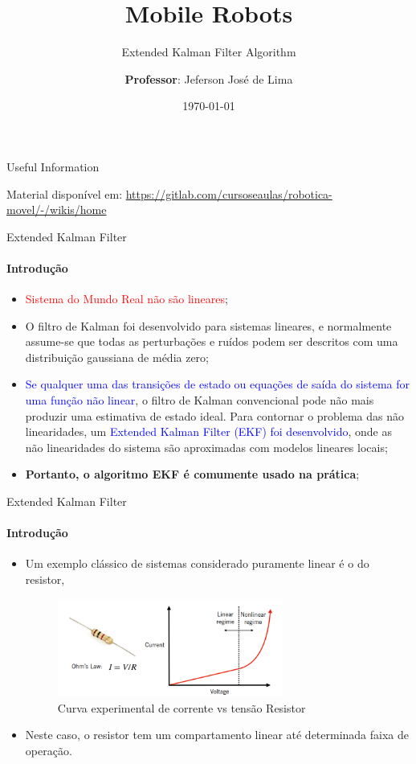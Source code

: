\documentclass[aspectratio=169]{beamer}
\title{Mobile Robots}
\subtitle{Extended Kalman Filter Algorithm}
\date{\today}
\author[Jeferson José de Lima]{
\textbf{Professor}: Jeferson José de Lima}
\institute{Academic Department of Informatics (DAINF) \\ Federal University of Technology - Paraná (UTFPR) at Pato Branco, PR, Brazil}
\begin{document}
\maketitle

\begin{frame}{Useful Information}
	\begin{block}{Material disponível em:}
		\href{Robótica Móvel - Wiki}{https://gitlab.com/cursoseaulas/robotica-movel/-/wikis/home}
	\end{block}
\end{frame}

\begin{frame}[c]{Extended Kalman Filter}
    \framesubtitle{Introdução}
    \begin{itemize}
        \item \textcolor{red}{Sistema do Mundo Real não são lineares};
        \item O filtro de Kalman foi desenvolvido para sistemas lineares, e normalmente assume-se que todas as perturbações e ruídos podem ser descritos com uma distribuição gaussiana de média zero;
        \item \textcolor{blue}{Se qualquer uma das transições de estado ou equações de saída do sistema for uma função não linear}, o filtro de Kalman convencional pode não mais produzir uma estimativa de estado ideal. Para contornar o problema das não linearidades, um \textcolor{blue}{Extended Kalman Filter (EKF) foi desenvolvido}, onde as não linearidades do sistema são aproximadas com modelos lineares locais;
        \item \textbf{Portanto, o algoritmo EKF é comumente usado na prática};
    \end{itemize}

\end{frame}


\begin{frame}[c]{Extended Kalman Filter}
    \framesubtitle{Introdução}
    \begin{itemize}
        \item Um exemplo clássico de sistemas considerado puramente linear é o do resistor,


    \begin{figure}
        \centering
        \includegraphics[width=0.7\textwidth]{./images/resistor_curve.png}
        \caption{Curva experimental de corrente vs tensão Resistor}
    \end{figure}

        \item Neste caso, o resistor tem um compartamento linear até determinada faixa de operação.
    \end{itemize}
\end{frame}
\end{document}
